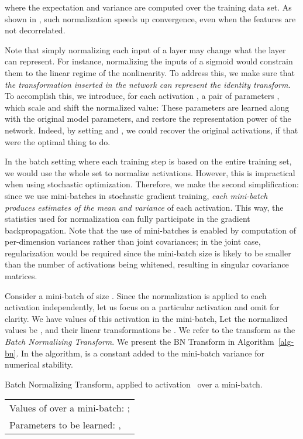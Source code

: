 \documentclass[twocolumn]{article}
\begin{document}
where the expectation and variance are
computed over the training data set. As shown in
\cite{lecun-backprop}, such normalization speeds up convergence,
even when the  features are not decorrelated.


Note that simply normalizing each input of a layer may change what the
layer can represent. For instance, normalizing the inputs of a
sigmoid would constrain them to the linear
regime of the nonlinearity. To address this, we make sure that {\em the transformation inserted in
  the network can represent the identity transform}.  To
accomplish this, we introduce, for each activation , a pair of
parameters , which scale and shift the
normalized value:  These parameters are learned along with the original model
parameters, and restore the representation power of the
network. Indeed, by setting  and
, we could recover the original activations, if that were the optimal thing to do.

In the batch setting where each training step is based on the entire training
set, we would use the whole set to normalize activations. However, this is
impractical when using stochastic optimization. Therefore, we make the second
simplification: since we use mini-batches in stochastic gradient training, {\em
  each mini-batch produces estimates of the mean and variance} of each
activation. This way, the statistics used for normalization can fully
participate in the gradient backpropagation.
Note that the use of mini-batches is enabled by computation of
per-dimension variances rather than joint covariances; in the joint case,
regularization would be required since the mini-batch size is likely to be
smaller than the number of activations being whitened, resulting in singular
covariance matrices.

Consider a mini-batch  of size . Since the normalization is applied to
each activation independently, let us focus on a particular activation  and omit  for clarity. We have  values of this activation
in the mini-batch,
 Let the normalized values be
, and their linear transformations be . We refer to the transform  as the {\em Batch Normalizing  Transform}.
  We present the BN Transform in Algorithm~\ref{alg-bn}.  In the algorithm,  is a constant  added to the mini-batch variance for numerical stability.

\begin{algorithm}
  \caption{Batch Normalizing Transform, applied to \mbox{activation } over a mini-batch. }
\label{alg-bn}
  \begin{algorithmic}
  \REQUIRE 
  \begin{tabular}[t]{@{}l}Values of    over a mini-batch:
  ;\\ 
 Parameters to be learned: ,
     \end{tabular}
  \ENSURE 
  
\end{algorithmic}
\end{algorithm}
\end{document}
